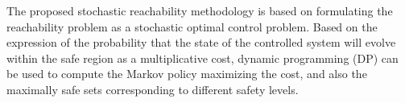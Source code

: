 The proposed stochastic reachability methodology is based on formulating the reachability problem as a stochastic optimal control problem. Based on the expression of the probability that the state of the controlled system will evolve within the safe region as a multiplicative cost, dynamic programming (DP) can be used to compute the Markov policy maximizing the cost, and also the maximally safe sets corresponding to different safety levels. 



